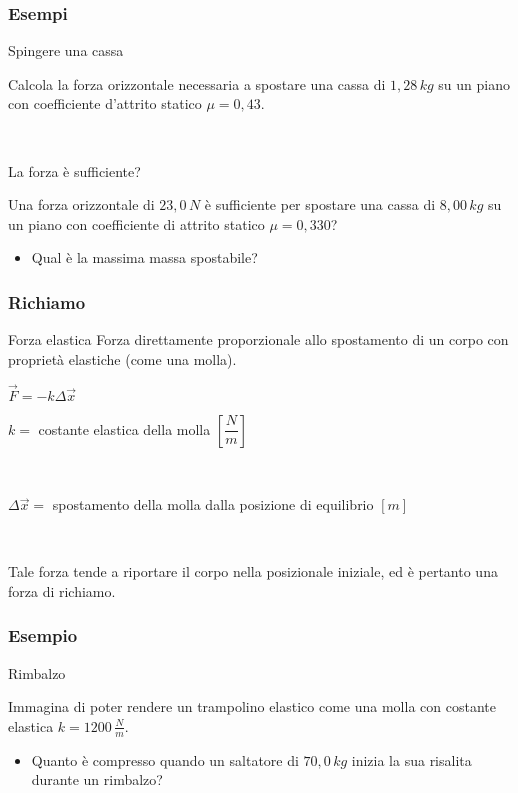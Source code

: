 \documentclass[]{beamer}
\theoremstyle{plain}
\begin{document}
\begin{frame}
\frametitle{Esempi}
\begin{exampleblock}{Spingere una cassa}
\begin{small}
Calcola la forza orizzontale necessaria a spostare una cassa di $ 1,28 \, kg $ su un piano con coefficiente d'attrito statico $ \mu = 0,43 $.
\end{small}
\end{exampleblock}

~

\begin{exampleblock}{La forza è sufficiente?}
\begin{small}
Una forza orizzontale di $ 23,0 \, N $ è sufficiente per spostare una cassa di $ 8,00 \, kg $ su un piano con coefficiente di attrito statico $ \mu = 0,330 $?
\begin{itemize}
  \item Qual è la massima massa spostabile?
\end{itemize}
\end{small}
\end{exampleblock}
\end{frame}


\begin{frame}
  \frametitle{Richiamo}
\begin{block}{Forza elastica}
Forza direttamente proporzionale allo spostamento di un corpo con proprietà elastiche (come una molla).

\begin{center}
\colorbox{marroncino!30}{$ \vec{F} = - k \Delta \vec{x} $}
\end{center}
$ k = $ costante elastica della molla $ \left[ \dfrac{N}{m} \right]$

~

$ \Delta \vec{x} = $ spostamento della molla dalla posizione di equilibrio $ [m] $
\end{block}\pause

~

Tale forza tende a riportare il corpo nella posizionale iniziale, ed è pertanto una \alert{forza di richiamo}.
\end{frame}

\begin{frame}
\frametitle{Esempio}
\begin{exampleblock}{Rimbalzo}
{\small Immagina di poter rendere un trampolino elastico come una molla con costante elastica $ k = 1200 \, \frac{N}{m} $.
\begin{itemize}
  \item Quanto è compresso quando un saltatore di $ 70,0 \, kg $ inizia la sua risalita durante un rimbalzo?
\end{itemize}
}
\end{exampleblock}
\end{frame}
\end{document}
